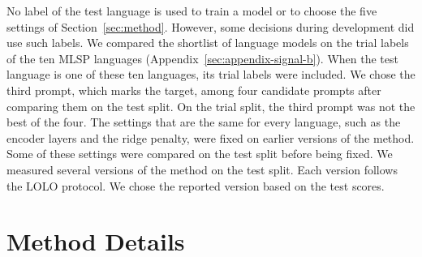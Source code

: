 \documentclass[11pt]{article}
\begin{document}
No label of the test language is used to train a model or to choose the five settings of %
Section~\ref{sec:method}. However, some decisions during development did use such labels. We
compared the shortlist of language models on the trial labels of the ten MLSP languages %
(Appendix~\ref{sec:appendix-signal-b}). When the test language is one of these ten languages, %
its trial
labels were included. We chose the third prompt, which marks the target, among four candidate %
prompts after comparing them on the test split. On the trial split, the third prompt was not the %
best of the four. The settings that are the same for every language, such as the encoder layers
and the ridge penalty, were fixed on earlier versions of the method. Some of these settings were %
compared on the test split before being fixed. We measured several versions of the method on the %
test split. Each version follows the LOLO protocol. We chose the reported version based on the
test scores.



\newpage

%



\appendix


\section{Method Details}
\label{sec:appendix-method}
\end{document}
